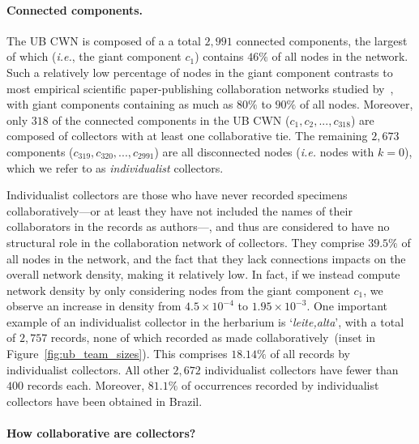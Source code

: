 \paragraph{Connected components.}
The UB CWN is composed of a a total $2,991$ connected components, the largest of which (\textit{i.e.}, the giant component $c_1$) contains $46\%$ of all nodes in the network.
Such a relatively low percentage of nodes in the giant component contrasts to most empirical scientific paper-publishing collaboration networks studied by~, with giant components containing as much as $80\%$ to $90\%$ of all nodes.
Moreover, only $318$ of the connected components in the UB CWN ($c_1, c_2, ..., c_{318}$) are composed of collectors with at least one collaborative tie.
The remaining $2,673$ components ($c_{319}, c_{320}, ..., c_{2991}$) are all disconnected nodes (\textit{i.e.} nodes with $k=0$), which we refer to as \textit{individualist} collectors.


Individualist collectors are those who have never recorded specimens collaboratively---or at least they have not included the names of their collaborators in the records as authors---, and thus are considered to have no structural role in the collaboration network of collectors.
They comprise $39.5\%$ of all nodes in the network, and the fact that they lack connections impacts on the overall network density, making it relatively low.
In fact, if we instead compute network density by only considering nodes from the giant component $c_1$, we observe an increase in density from $4.5 \times 10^{-4}$ to $1.95 \times 10^{-3}$. 
%
One important example of an individualist collector in the herbarium is `\textit{leite,alta}', with a total of $2,757$ records, none of which recorded as made collaboratively~(inset in Figure~\ref{fig:ub_team_sizes}).  %
This comprises $18.14\%$ of all records by individualist collectors.
All other $2,672$ individualist collectors have fewer than $400$ records each.
Moreover, $81.1\%$ of occurrences recorded by individualist collectors have been obtained in Brazil.



\paragraph{How collaborative are collectors?}

